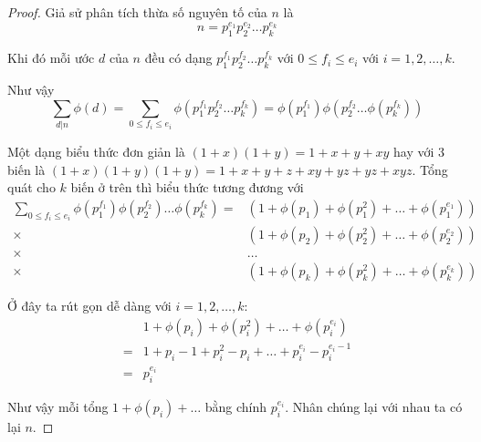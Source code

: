 \begin{proof}
    Giả sử phân tích thừa số nguyên tố của $n$ là 
    \[n = p_1^{e_1} p_2^{e_2} \ldots p_k^{e_k}\]

    Khi đó mỗi ước $d$ của $n$ đều có dạng $p_1^{f_1} p_2^{f_2} \ldots p_k^{f_k}$
    với $0 \leq f_i \leq e_i$ với $i = 1, 2, \ldots, k$.

    Như vậy
    \[\sum_{d | n} \phi(d) = \sum_{0 \leq f_i \leq e_i} \phi(p_1^{f_1} p_2^{f_2} \ldots p_k^{f_k})
    = \phi(p_1^{f_1}) \phi(p_2^{f_2} \ldots \phi(p_k^{f_k}))\]

    Một dạng biểu thức đơn giản là $(1+x)(1+y) = 1+x+y+xy$ hay với 3 biến
    là $(1+x)(1+y)(1+y) = 1 + x + y + z + xy + yz + yz + xyz$. Tổng quát cho 
    $k$ biến ở trên thì biểu thức tương đương với
    \begin{align*}
    \sum_{0 \leq f_i \leq e_i} \phi(p_1^{f_1}) \phi(p_2^{f_2}) \ldots
    \phi(p_k^{f_k}) = & (1 + \phi(p_1) + \phi(p_1^2) + \ldots + \phi(p_1^{e_1})) \\
    \times & (1 + \phi(p_2) + \phi(p_2^2) + \ldots + \phi(p_2^{e_2})) \\
    \times & \ldots \\
    \times & (1 + \phi(p_k) + \phi(p_k^2) + \ldots + \phi(p_k^{e_k}))
    \end{align*}

    Ở đây ta rút gọn dễ dàng với $i = 1, 2, \ldots, k$:
    \begin{align*}
    & 1 + \phi(p_i) + \phi(p_i^2) + \ldots + \phi(p_i^{e_i}) \\
    = & 1 + p_i - 1 + p_i^2 - p_i + \ldots + p_i^{e_i} - p_i^{e_i-1} \\
    = & p_i^{e_i}
    \end{align*}

    Như vậy mỗi tổng $1 + \phi(p_i) + \ldots$ bằng chính $p_i^{e_i}$. 
    Nhân chúng lại với nhau ta có lại $n$.
\end{proof}